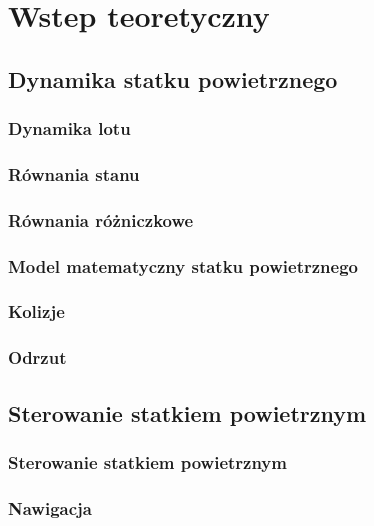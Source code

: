 \documentclass[aspectratio=169]{beamer}
\newcommand{\epiline}{\hrule \vskip -.2em \hrule}
\newcommand{\hugequote}{%
  \fontsize{42}{48}\selectfont \color{quotationmarkcolour} \textbf{``}
  \vskip -.5em
}
\newcommand{\epigraph}[2]{%
  \bigskip
  \begin{center}
  \colorbox{quotationcolour}{%
    \parbox{.80\textwidth}{%
    \epiline \vskip 1em {\hugequote} \vskip -.5em
    \parindent 2.2em
    #1\begin{flushright}\textsc{#2}\end{flushright}
    \epiline
    }
  }
  \end{center}
  \bigskip
}
\begin{document}
\section{Wstep teoretyczny}


\subsection{Dynamika statku powietrznego}
\begin{frame}[allowframebreaks]
	\frametitle{Dynamika lotu}
	
\end{frame}

\begin{frame}[allowframebreaks]
	\frametitle{Równania stanu}
	
\end{frame}

\begin{frame}[allowframebreaks]
	\frametitle{Równania różniczkowe}
	
\end{frame}

\begin{frame}[allowframebreaks]
	\frametitle{Model matematyczny statku powietrznego}
	
\end{frame}

\begin{frame}[allowframebreaks]
	\frametitle{Kolizje}
	
\end{frame}

\begin{frame}[allowframebreaks]
	\frametitle{Odrzut}
	
\end{frame}

\subsection{Sterowanie statkiem powietrznym}
\begin{frame}[allowframebreaks]
	\frametitle{Sterowanie statkiem powietrznym}
\end{frame}

\begin{frame}[allowframebreaks]
	\frametitle{Nawigacja}
	
\end{frame}
\end{document}
